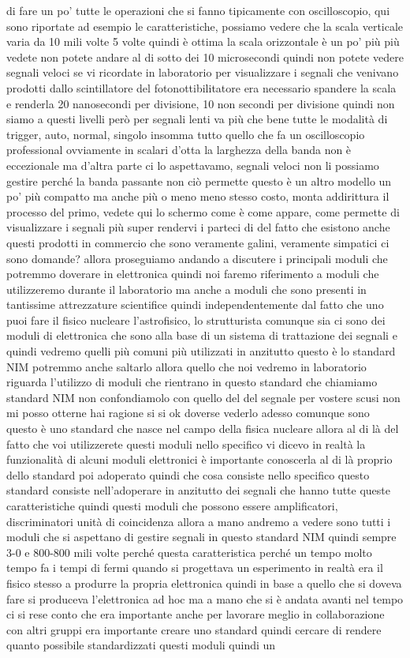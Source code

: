 di fare un po' tutte le operazioni che si fanno tipicamente con oscilloscopio, qui sono riportate ad esempio le caratteristiche, possiamo vedere che la scala verticale varia da 10 mili volte 5 volte quindi è ottima la scala orizzontale è un po' più più vedete non potete andare al di sotto dei 10 microsecondi quindi non potete vedere segnali veloci se vi ricordate in laboratorio per visualizzare i segnali che venivano prodotti dallo scintillatore del fotonottibilitatore era necessario spandere la scala e renderla 20 nanosecondi per divisione, 10 non secondi per divisione quindi non siamo a questi livelli però per segnali lenti va più che bene tutte le modalità di trigger, auto, normal, singolo insomma tutto quello che fa un oscilloscopio professional ovviamente in scalari d'otta la larghezza della banda non è eccezionale ma d'altra parte ci lo aspettavamo, segnali veloci non li possiamo gestire perché la banda passante non ciò permette questo è un altro modello un po' più compatto ma anche più o meno meno stesso costo, monta addirittura il processo del primo, vedete qui lo schermo come è come appare, come permette di visualizzare i segnali più super rendervi i parteci di del fatto che esistono anche questi prodotti in commercio che sono veramente galini, veramente simpatici ci sono domande? allora proseguiamo andando a discutere i principali moduli che potremmo doverare in elettronica quindi noi faremo riferimento a moduli che utilizzeremo durante il laboratorio ma anche a moduli che sono presenti in tantissime attrezzature scientifice quindi independentemente dal fatto che uno puoi fare il fisico nucleare l'astrofisico, lo strutturista comunque sia ci sono dei moduli di elettronica che sono alla base di un sistema di trattazione dei segnali e quindi vedremo quelli più comuni più utilizzati in anzitutto questo è lo standard NIM potremmo anche saltarlo allora quello che noi vedremo in laboratorio riguarda l'utilizzo di moduli che rientrano in questo standard che chiamiamo standard NIM non confondiamolo con quello del del segnale per vostere scusi non mi posso otterne hai ragione si si ok doverse vederlo adesso comunque sono questo è uno standard che nasce nel campo della fisica nucleare allora al di là del fatto che voi utilizzerete questi moduli nello specifico vi dicevo in realtà la funzionalità di alcuni moduli elettronici è importante conoscerla al di là proprio dello standard poi adoperato quindi che cosa consiste nello specifico questo standard consiste nell'adoperare in anzitutto dei segnali che hanno tutte queste caratteristiche quindi questi moduli che possono essere amplificatori, discriminatori unità di coincidenza allora a mano andremo a vedere sono tutti i moduli che si aspettano di gestire segnali in questo standard NIM quindi sempre 3-0 e 800-800 mili volte perché questa caratteristica perché un tempo molto tempo fa i tempi di fermi quando si progettava un esperimento in realtà era il fisico stesso a produrre la propria elettronica quindi in base a quello che si doveva fare si produceva l'elettronica ad hoc ma a mano che si è andata avanti nel tempo ci si rese conto che era importante anche per lavorare meglio in collaborazione con altri gruppi era importante creare uno standard quindi cercare di rendere quanto possibile standardizzati questi moduli quindi un 